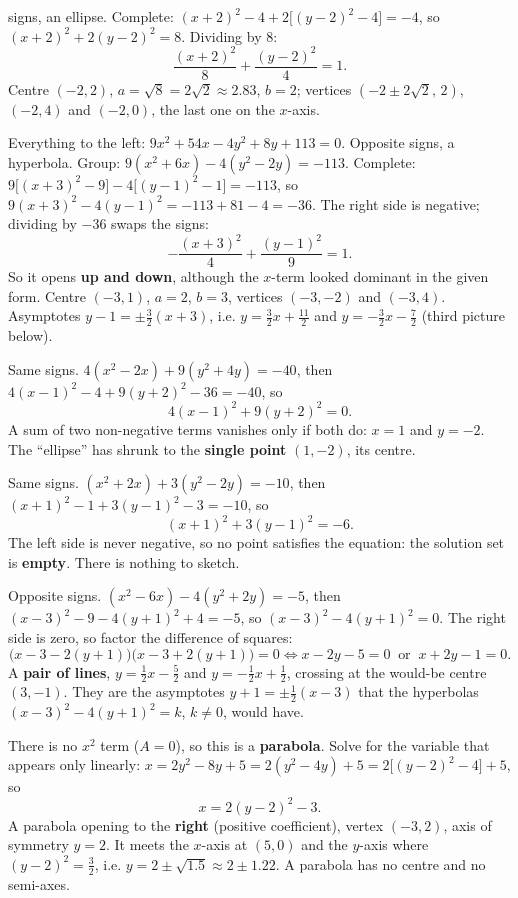 \begin{solutions}
        signs, an ellipse. Complete:
        $(x+2)^{2}-4+2\bigl[(y-2)^{2}-4\bigr]=-4$, so
        $(x+2)^{2}+2(y-2)^{2}=8$. Dividing by $8$:
        \[
          \frac{(x+2)^{2}}{8}+\frac{(y-2)^{2}}{4}=1 .
        \]
        Centre $(-2,2)$, $a=\sqrt8=2\sqrt2\approx2.83$, $b=2$; vertices
        $(-2\pm2\sqrt2,\,2)$, $(-2,4)$ and $(-2,0)$, the last one on the
        $x$-axis.
  \item Everything to the left: $9x^{2}+54x-4y^{2}+8y+113=0$. Opposite
        signs, a hyperbola. Group: $9(x^{2}+6x)-4(y^{2}-2y)=-113$.
        Complete: $9\bigl[(x+3)^{2}-9\bigr]-4\bigl[(y-1)^{2}-1\bigr]=-113$,
        so $9(x+3)^{2}-4(y-1)^{2}=-113+81-4=-36$. The right side is
        negative; dividing by $-36$ swaps the signs:
        \[
          -\frac{(x+3)^{2}}{4}+\frac{(y-1)^{2}}{9}=1 .
        \]
        So it opens \textbf{up and down}, although the $x$-term looked
        dominant in the given form. Centre $(-3,1)$, $a=2$, $b=3$, vertices
        $(-3,-2)$ and $(-3,4)$. Asymptotes $y-1=\pm\tfrac32(x+3)$, i.e.
        $y=\tfrac32x+\tfrac{11}{2}$ and $y=-\tfrac32x-\tfrac72$ (third
        picture below).
  \item Same signs. $4(x^{2}-2x)+9(y^{2}+4y)=-40$, then
        $4(x-1)^{2}-4+9(y+2)^{2}-36=-40$, so
        \[
          4(x-1)^{2}+9(y+2)^{2}=0 .
        \]
        A sum of two non-negative terms vanishes only if both do:
        $x=1$ and $y=-2$. The ``ellipse'' has shrunk to the
        \textbf{single point} $(1,-2)$, its centre.
  \item Same signs. $(x^{2}+2x)+3(y^{2}-2y)=-10$, then
        $(x+1)^{2}-1+3(y-1)^{2}-3=-10$, so
        \[
          (x+1)^{2}+3(y-1)^{2}=-6 .
        \]
        The left side is never negative, so no point satisfies the
        equation: the solution set is \textbf{empty}. There is nothing to
        sketch.
  \item Opposite signs. $(x^{2}-6x)-4(y^{2}+2y)=-5$, then
        $(x-3)^{2}-9-4(y+1)^{2}+4=-5$, so $(x-3)^{2}-4(y+1)^{2}=0$. The
        right side is zero, so factor the difference of squares:
        \[
          \bigl(x-3-2(y+1)\bigr)\bigl(x-3+2(y+1)\bigr)=0
          \iff x-2y-5=0\ \text{ or }\ x+2y-1=0 .
        \]
        A \textbf{pair of lines}, $y=\tfrac12x-\tfrac52$ and
        $y=-\tfrac12x+\tfrac12$, crossing at the would-be centre
        $(3,-1)$. They are the asymptotes $y+1=\pm\tfrac12(x-3)$ that the
        hyperbolas $(x-3)^{2}-4(y+1)^{2}=k$, $k\neq0$, would have.
  \item There is no $x^{2}$ term ($A=0$), so this is a \textbf{parabola}.
        Solve for the variable that appears only linearly:
        $x=2y^{2}-8y+5=2(y^{2}-4y)+5=2\bigl[(y-2)^{2}-4\bigr]+5$, so
        \[
          x=2(y-2)^{2}-3 .
        \]
        A parabola opening to the \textbf{right} (positive coefficient),
        vertex $(-3,2)$, axis of symmetry $y=2$. It meets the $x$-axis at
        $(5,0)$ and the $y$-axis where $(y-2)^{2}=\tfrac32$, i.e.
        $y=2\pm\sqrt{1.5}\approx2\pm1.22$. A parabola has no centre and no
        semi-axes.
\end{solutions}

